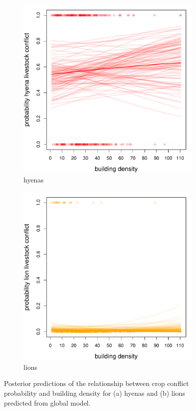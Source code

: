 \documentclass[12pt,]{article}
\begin{document}
\begin{figure}[H]
  \centering
	\begin{subfigure}[b]{0.49\textwidth}
	\includegraphics[width=\textwidth]{Figures/build_dens_livestock_global_conflict_hyena.pdf} 
    \caption{hyenas}
   	    \label{fig:cropBDhyena}
\end{subfigure}
\begin{subfigure}[b]{0.49\textwidth}
	\includegraphics[width=\textwidth]{Figures/build_dens_livestock_global_conflict_lion.pdf}  
    \caption{lions}
  	\label{fig:cropBDleo}
\end{subfigure}
\caption{Posterior predictions of the relationship between crop conflict probability and building density for (a) hyenas and (b) lions predicted from global model.}
\end{figure}
\end{document}
